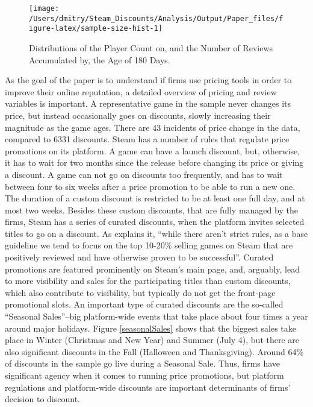 \documentclass[
  12pt,
  pagebackref]{article}
\begin{document}
\begin{figure}[h]

{\centering \texttt{[image: /Users/dmitry/Steam\_Discounts/Analysis/Output/Paper\_files/figure-latex/sample-size-hist-1]} 

}

\caption{\label{sampleSizeHist} Distributions of the Player Count on, and the Number of Reviews Accumulated by, the Age of 180 Days.}\label{fig:sample-size-hist}
\end{figure}

As the goal of the paper is to understand if firms use pricing tools in
order to improve their online reputation, a detailed overview of pricing
and review variables is important. A representative game in the sample
never changes its price, but instead occasionally goes on discounts,
slowly increasing their magnitude as the game ages. There are 43
incidents of price change in the data, compared to 6331 discounts. Steam
has a number of rules that regulate price promotions on its platform. A
game can have a launch discount, but, otherwise, it has to wait for two
months since the release before changing its price or giving a discount.
A game can not go on discounts too frequently, and has to wait between
four to six weeks after a price promotion to be able to run a new one.
The duration of a custom discount is restricted to be at least one full
day, and at most two weeks. Besides these custom discounts, that are
fully managed by the firms, Steam has a series of curated discounts,
when the platform invites selected titles to go on a discount. As
\citet{steamDiscounting} explains it, ``while there aren't strict rules,
as a base guideline we tend to focus on the top 10-20\% selling games on
Steam that are positively reviewed and have otherwise proven to be
successful''. Curated promotions are featured prominently on Steam's
main page, and, arguably, lead to more visibility and sales for the
participating titles than custom discounts, which also contribute to
visibility, but typically do not get the front-page promotional slots.
An important type of curated discounts are the so-called ``Seasonal
Sales''--big platform-wide events that take place about four times a
year around major holidays. Figure \ref{seasonalSales} shows that the
biggest sales take place in Winter (Christmas and New Year) and Summer
(July 4), but there are also significant discounts in the Fall
(Halloween and Thanksgiving). Around 64\% of discounts in the sample go
live during a Seasonal Sale. Thus, firms have significant agency when it
comes to running price promotions, but platform regulations and
platform-wide discounts are important determinants of firms' decision to
discount.
\end{document}
